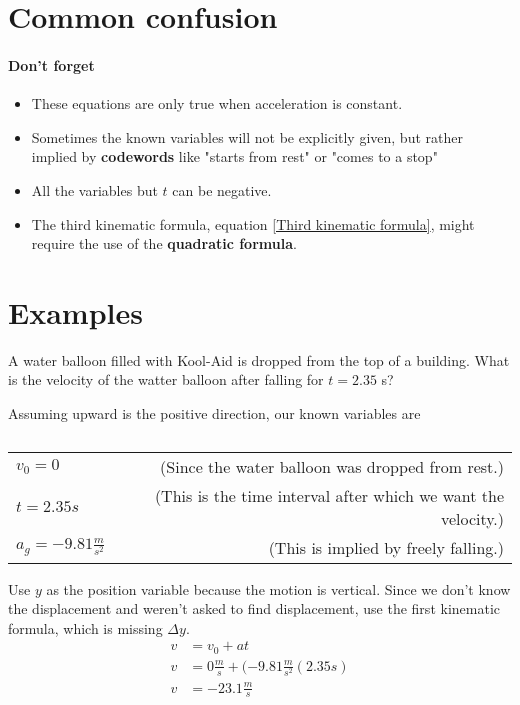 \section{Common confusion}%
\label{sec:common_confusion}

\paragraph{Don't forget}%
\label{par:don_t_forget}
\begin{itemize}
	\item  These equations are only true when acceleration is constant.
	\item Sometimes the known variables will not be explicitly given, but rather
		implied by \textbf{codewords} like "starts from rest" or "comes to a stop"
	\item All the variables but $t$ can be negative.
	\item  The third kinematic formula, equation \ref{Third kinematic formula}, might
		require the use of the \textbf{quadratic formula}.
\end{itemize}

\section{Examples}%
\label{sec:examples}

\begin{example}[First kinematic formula, $v = v_0 + at$]
	A water balloon filled with Kool-Aid is dropped from the
	top of a building. What is the velocity of the watter balloon
	after falling for $t = 2.35$ s?
\end{example}

\begin{solution}[]
	Assuming upward is the positive direction, our known variables are
	\begin{table}[htpb]
		\centering
		\caption{}
		\label{tab:label}
		\begin{tabular}{l r}
			$v_0 = 0$ & (Since the water balloon was dropped from rest.) \\
			$t = 2.35 s$ & (This is the time interval after which we want the velocity.) \\
			$a_g = -9.81 \frac{m}{s^2}$ & (This is implied by freely falling.)
		\end{tabular}
	\end{table}
\end{solution}

Use $y$ as the position variable because the motion is vertical. Since we don't know the
displacement and weren't asked to find displacement, use the first kinematic formula, which
is missing $\Delta y$.
\begin{align*}
	v &= v_0 +at \\
	v &= 0 \frac{m}{s} + (-9.81 \frac{m}{s^2}(2.35 s) \\
	v &=  -23.1 \frac{m}{s}
\end{align*}

